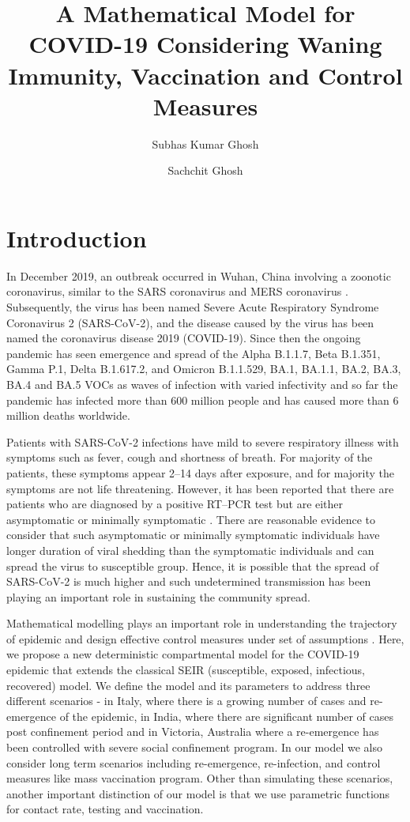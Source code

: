 \documentclass[10pt]{wlscirep}
\title{A Mathematical Model for COVID-19 Considering Waning Immunity, Vaccination and Control Measures}
\author[1,a]{Subhas Kumar Ghosh}
\author[2]{Sachchit Ghosh}
\affil[1]{National Australia Bank, Sydney, New South Wales, 2000, Australia}
\affil[2]{The University of Sydney, Camperdown, NSW 2006, Australia}
\affil[a]{subhas.ghosh@nab.com.au}
\begin{document}
	
\flushbottom
\maketitle
\thispagestyle{empty}

\section*{Introduction}
\label{SEC1}
In December 2019, an outbreak occurred in Wuhan, China involving a zoonotic coronavirus, similar to the SARS coronavirus and MERS coronavirus  \cite{taaa021}. Subsequently, the virus has been named Severe Acute Respiratory Syndrome Coronavirus 2 (SARS-CoV-2), and the disease caused by the virus has been named the coronavirus disease 2019 (COVID-19). Since then the ongoing pandemic has seen emergence and spread of the Alpha B.1.1.7, Beta B.1.351, Gamma P.1, Delta B.1.617.2, and Omicron B.1.1.529, BA.1, BA.1.1, BA.2, BA.3, BA.4 and BA.5 VOCs as waves of infection with varied infectivity and so far the pandemic has infected more than 600 million people and has caused more than 6 million deaths worldwide.

Patients with SARS-CoV-2 infections have mild to severe respiratory illness with symptoms such as fever, cough and shortness of breath. For majority of the patients, these symptoms appear 2–14 days after exposure, and for majority the symptoms are not life threatening. However, it has been reported that there are patients who are diagnosed by a positive RT–PCR test but are either asymptomatic or minimally symptomatic \cite{pmid32146694,pmid32179137,pmid32083643,Kenji2020,Long2020}. There are reasonable evidence to consider that such asymptomatic or minimally symptomatic individuals have longer duration of viral shedding than the symptomatic individuals and can spread the virus to susceptible group\cite{Long2020}.  Hence, it is possible that the spread of SARS-CoV-2 is much higher and such undetermined transmission has been playing an important role in sustaining the community spread. 

Mathematical modelling plays an important role in understanding the trajectory of epidemic and design effective control measures under set of assumptions \cite{539a5e40c4cf4e6a8dc8035b3930c45d,doi:10.1098/rspb.2004.2800,Giordano2020}. Here, we propose a new deterministic compartmental model for the COVID-19 epidemic that extends the classical SEIR (susceptible, exposed, infectious, recovered) model. We define the model and its parameters to address three different scenarios - in Italy, where there is a growing number of cases and re-emergence of the epidemic, in India, where there are significant number of cases post confinement period and in Victoria, Australia where a re-emergence has been controlled with severe social confinement program. In our model we also consider long term scenarios including re-emergence, re-infection, and control measures like mass vaccination program. Other than simulating these scenarios, another important distinction of our model is that we use parametric functions for contact rate, testing and vaccination.
\end{document}
